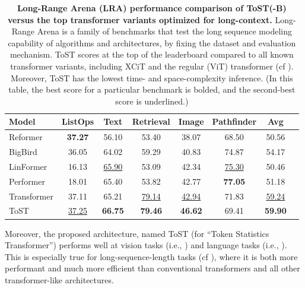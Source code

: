 \documentclass[../../book-main.tex]{subfiles}
\begin{document}
\begin{table}
\centering

\begin{tabular}{@{}lccccccc@{}}
\toprule
Model        & ListOps  & Text     & Retrieval & Image    &
Pathfinder & Avg      \\
\midrule
\midrule
Reformer              & \textbf{37.27} & 56.10             & 53.40
& 38.07             & 68.50               & 50.56             \\
BigBird               & 36.05             & 64.02             & 59.29
& 40.83             & 74.87                & 54.17             \\
LinFormer         & 16.13             & \underline{65.90} & 53.09
& 42.34             & \underline{75.30}               & 50.46             \\
Performer             & 18.01             & 65.40             & 53.82
& 42.77             & \textbf{77.05}                & 51.18             \\
Transformer           & 37.11             & 65.21             &
\underline{79.14}              & \underline{42.94}             &
71.83              & \underline{59.24}            \\
ToST & \underline{37.25}    & \textbf{66.75}    & \textbf{79.46}
& \textbf{46.62}    &    69.41      &     \textbf{59.90}\\

\bottomrule
\end{tabular}%
\caption{\small \textbf{Long-Range Arena (LRA) performance comparison
of ToST(-B) versus the top transformer variants optimized for
long-context.} Long-Range Arena is a family of benchmarks that test
the long sequence modeling capability of algorithms and
architectures, by fixing the dataset and evaluation mechanism. ToST
scores at the top of the leaderboard compared to all known
transformer variants, including XCiT and the regular (ViT)
transformer (cf ). Moreover, ToST has
the lowest time- and space-complexity inference. (In this table, the
best score for a particular benchmark is bolded, and the second-best
score is underlined.)}
\label{tab:tost_lra_results}
\end{table}

Moreover, the proposed architecture, named ToST (for ``Token
Statistics Transformer'') performs well at vision tasks (i.e.,
) and language tasks (i.e.,
). This is especially true for long-sequence-length
tasks (cf ), where it is both more
performant and much more efficient than conventional transformers and
all other transformer-like architectures.
\end{document}
